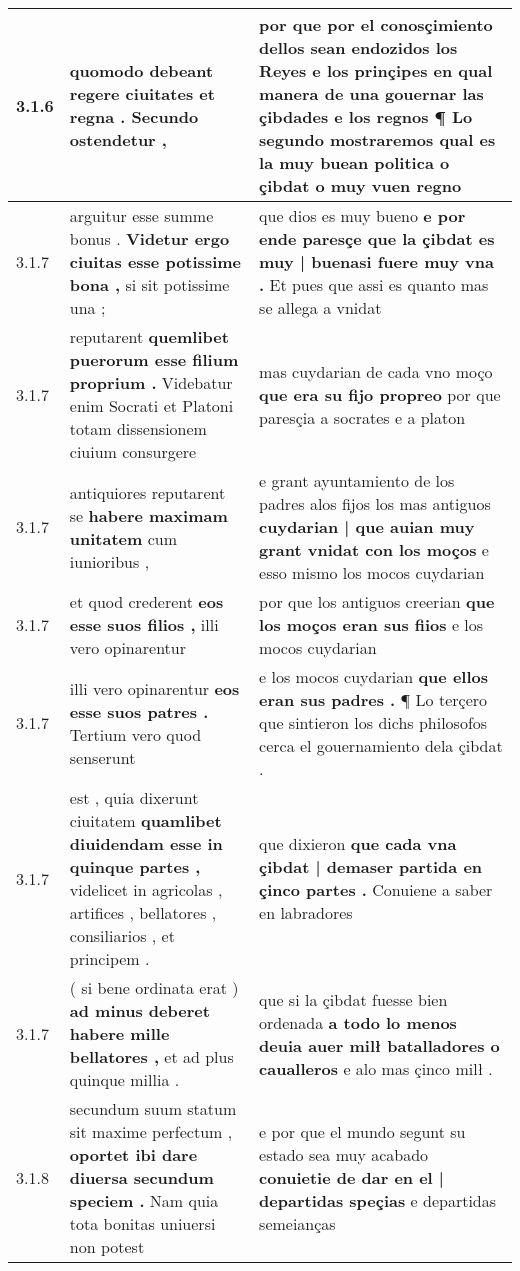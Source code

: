 \begin{tabular}{|p{1cm}|p{6.5cm}|p{6.5cm}|}
3.1.6 & quomodo debeant \textbf{ regere ciuitates et regna . } Secundo ostendetur , & por que por el conosçimiento dellos sean endozidos los Reyes e los prinçipes \textbf{ en qual manera de una gouernar las çibdades e los regnos ¶ } Lo segundo mostraremos qual es la muy buean politica o çibdat o muy vuen regno \\\hline
3.1.7 & arguitur esse summe bonus . \textbf{ Videtur ergo ciuitas esse potissime bona , } si sit potissime una ; & que dios es muy bueno \textbf{ e por ende paresçe que la çibdat es muy | buenasi fuere muy vna . } Et pues que assi es quanto mas se allega a vnidat \\\hline
3.1.7 & reputarent \textbf{ quemlibet puerorum esse filium proprium . } Videbatur enim Socrati et Platoni totam dissensionem ciuium consurgere & mas cuydarian de cada vno moço \textbf{ que era su fijo propreo } por que paresçia a socrates e a platon \\\hline
3.1.7 & antiquiores reputarent se \textbf{ habere maximam unitatem } cum iunioribus , & e grant ayuntamiento de los padres alos fijos los mas antiguos \textbf{ cuydarian | que auian muy grant vnidat con los moços } e esso mismo los mocos cuydarian \\\hline
3.1.7 & et quod crederent \textbf{ eos esse suos filios , } illi vero opinarentur & por que los antiguos creerian \textbf{ que los moços eran sus fiios } e los mocos cuydarian \\\hline
3.1.7 & illi vero opinarentur \textbf{ eos esse suos patres . } Tertium vero quod senserunt & e los mocos cuydarian \textbf{ que ellos eran sus padres . } ¶ Lo terçero que sintieron los dichs philosofos cerca el gouernamiento dela çibdat . \\\hline
3.1.7 & est , quia dixerunt ciuitatem \textbf{ quamlibet diuidendam esse in quinque partes , } videlicet in agricolas , artifices , bellatores , consiliarios , et principem . & que dixieron \textbf{ que cada vna çibdat | demaser partida en çinco partes . } Conuiene a saber en labradores \\\hline
3.1.7 & ( si bene ordinata erat ) \textbf{ ad minus deberet habere mille bellatores , } et ad plus quinque millia . & que si la çibdat fuesse bien ordenada \textbf{ a todo lo menos deuia auer milł batalladores o caualleros } e alo mas çinco milł . \\\hline
3.1.8 & secundum suum statum sit maxime perfectum , \textbf{ oportet ibi dare diuersa secundum speciem . } Nam quia tota bonitas uniuersi non potest & e por que el mundo segunt su estado sea muy acabado \textbf{ conuietie de dar en el | departidas speçias } e departidas semeianças \\\hline

\end{tabular}
